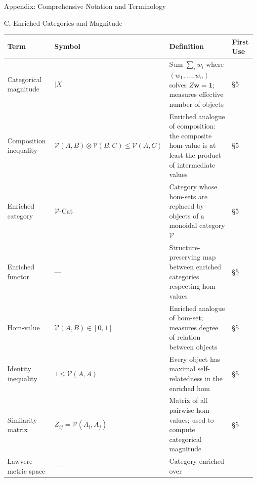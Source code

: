 \documentclass[
  ignorenonframetext,
]{beamer}
\newcounter{none} %
\begin{document}
\begin{frame}[fragile]{Appendix: Comprehensive Notation and Terminology}
\begin{block}{C. Enriched Categories and Magnitude}
\protect{}\label{c.-enriched-categories-and-magnitude}
{\def\LTcaptype{none} %
\begin{longtable}[]{@{}
  >{\raggedright\arraybackslash}p{}
  >{\centering\arraybackslash}p{}
  >{\raggedright\arraybackslash}p{}
  >{\centering\arraybackslash}p{}@{}}
\toprule\noalign{}
\begin{minipage}[b]{\linewidth}\raggedright
Term
\end{minipage} & \begin{minipage}[b]{\linewidth}\centering
Symbol
\end{minipage} & \begin{minipage}[b]{\linewidth}\raggedright
Definition
\end{minipage} & \begin{minipage}[b]{\linewidth}\centering
First Use
\end{minipage} \\
\midrule\noalign{}
\endhead
Categorical magnitude & \(\lvert X \rvert\) & Sum \(\sum_i w_i\) where
\((w_1, \ldots, w_n)\) solves \(Z \mathbf{w} = \mathbf{1}\); measures
effective number of objects & §5 \\
Composition inequality &
\(\mathcal{V}(A,B) \otimes \mathcal{V}(B,C) \leq \mathcal{V}(A,C)\) &
Enriched analogue of composition: the composite hom-value is at least
the product of intermediate values & §5 \\
Enriched category & \(\mathcal{V}\text{-Cat}\) & Category whose hom-sets
are replaced by objects of a monoidal category \(\mathcal{V}\) & §5 \\
Enriched functor & --- & Structure-preserving map between enriched
categories respecting hom-values & §5 \\
Hom-value & \(\mathcal{V}(A,B) \in [0,1]\) & Enriched analogue of
hom-set; measures degree of relation between objects & §5 \\
Identity inequality & \(1 \leq \mathcal{V}(A,A)\) & Every object has
maximal self-relatedness in the enriched hom & §5 \\
Similarity matrix & \(Z_{ij} = \mathcal{V}(A_i, A_j)\) & Matrix of all
pairwise hom-values; used to compute categorical magnitude & §5 \\
Lawvere metric space & --- & Category enriched over

\end{longtable}}
\end{block}
\end{frame}
\end{document}

